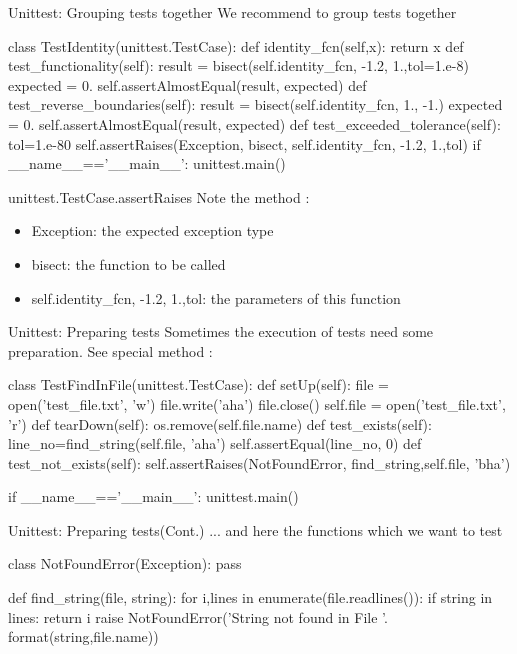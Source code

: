\documentclass[hyperref={pdfpagelabels=false},table, handout]{beamer}
\begin{document}
\begin{frame}[fragile]{Unittest: Grouping tests together}
We recommend to group tests together
\begin{python}
class TestIdentity(unittest.TestCase):
     def identity_fcn(self,x):
         return x
     def test_functionality(self):
         result = bisect(self.identity_fcn, -1.2, 1.,tol=1.e-8)
         expected = 0.
         self.assertAlmostEqual(result, expected)
     def test_reverse_boundaries(self):
         result = bisect(self.identity_fcn, 1., -1.)
         expected = 0.
         self.assertAlmostEqual(result, expected)
     def test_exceeded_tolerance(self):
         tol=1.e-80
         self.assertRaises(Exception, bisect, self.identity_fcn, 
                             -1.2, 1.,tol)        
if __name__=='__main__':
       unittest.main()
\end{python}
\end{frame}
\begin{frame}[fragile]{unittest.TestCase.assertRaises}
Note the method :\vfill
\begin{itemize}
\item Exception: the expected exception type
\item bisect: the function to be called
\item self.identity\_fcn, -1.2, 1.,tol: the parameters of this function
\end{itemize}
\vfill
\end{frame}
\begin{frame}[fragile]{Unittest: Preparing tests}
Sometimes the execution of tests need some preparation. See special method :
\begin{python}
class TestFindInFile(unittest.TestCase):
     def setUp(self):
         file = open('test_file.txt', 'w')
         file.write('aha')
         file.close()
         self.file = open('test_file.txt', 'r')
     def tearDown(self):
         os.remove(self.file.name)
     def test_exists(self):
         line_no=find_string(self.file, 'aha')
         self.assertEqual(line_no, 0)
     def test_not_exists(self):
         self.assertRaises(NotFoundError, 
                 find_string,self.file, 'bha')

if __name__=='__main__':
                unittest.main() 
\end{python}        

\end{frame}

\begin{frame}[fragile]{Unittest: Preparing tests\hfill(Cont.)}
... and here the functions which we want to test
\begin{python}
class NotFoundError(Exception):
      pass

def find_string(file, string):
    for i,lines in enumerate(file.readlines()):
       if string in lines:
          return i
    raise NotFoundError('String {} not found in File {}'.
                               format(string,file.name)) 
\end{python}        

\end{frame}
\end{document}
